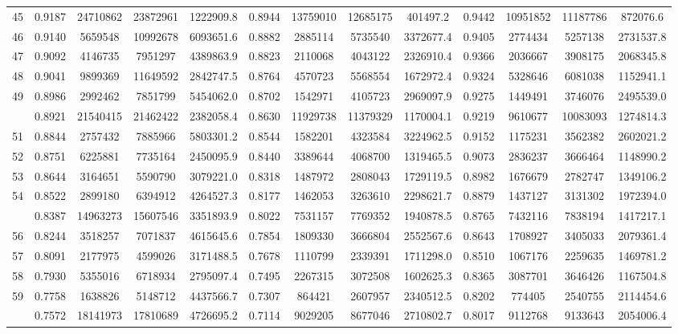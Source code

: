 \documentclass[
  12pt,
]{article}
\begin{document}
\begin{longtable}[t]{lcccccccccccc}
45 & 0.9187 & 24710862 & 23872961 & 1222909.8 & 0.8944 & 13759010 & 12685175 & 401497.2 & 0.9442 & 10951852 & 11187786 & 872076.6\\
46 & 0.9140 & 5659548 & 10992678 & 6093651.6 & 0.8882 & 2885114 & 5735540 & 3372677.4 & 0.9405 & 2774434 & 5257138 & 2731537.8\\
47 & 0.9092 & 4146735 & 7951297 & 4389863.9 & 0.8823 & 2110068 & 4043122 & 2326910.4 & 0.9366 & 2036667 & 3908175 & 2068345.8\\
48 & 0.9041 & 9899369 & 11649592 & 2842747.5 & 0.8764 & 4570723 & 5568554 & 1672972.4 & 0.9324 & 5328646 & 6081038 & 1152941.1\\
49 & 0.8986 & 2992462 & 7851799 & 5454062.0 & 0.8702 & 1542971 & 4105723 & 2969097.9 & 0.9275 & 1449491 & 3746076 & 2495539.0\\
\addlinespace
50 & 0.8921 & 21540415 & 21462422 & 2382058.4 & 0.8630 & 11929738 & 11379329 & 1170004.1 & 0.9219 & 9610677 & 10083093 & 1274814.3\\
51 & 0.8844 & 2757432 & 7885966 & 5803301.2 & 0.8544 & 1582201 & 4323584 & 3224962.5 & 0.9152 & 1175231 & 3562382 & 2602021.2\\
52 & 0.8751 & 6225881 & 7735164 & 2450095.9 & 0.8440 & 3389644 & 4068700 & 1319465.5 & 0.9073 & 2836237 & 3666464 & 1148990.2\\
53 & 0.8644 & 3164651 & 5590790 & 3079221.0 & 0.8318 & 1487972 & 2808043 & 1729119.5 & 0.8982 & 1676679 & 2782747 & 1349106.2\\
54 & 0.8522 & 2899180 & 6394912 & 4264527.3 & 0.8177 & 1462053 & 3263610 & 2298621.7 & 0.8879 & 1437127 & 3131302 & 1972394.0\\
\addlinespace
55 & 0.8387 & 14963273 & 15607546 & 3351893.9 & 0.8022 & 7531157 & 7769352 & 1940878.5 & 0.8765 & 7432116 & 7838194 & 1417217.1\\
56 & 0.8244 & 3518257 & 7071837 & 4615645.6 & 0.7854 & 1809330 & 3666804 & 2552567.6 & 0.8643 & 1708927 & 3405033 & 2079361.4\\
57 & 0.8091 & 2177975 & 4599026 & 3171488.5 & 0.7678 & 1110799 & 2339391 & 1711298.0 & 0.8510 & 1067176 & 2259635 & 1469781.2\\
58 & 0.7930 & 5355016 & 6718934 & 2795097.4 & 0.7495 & 2267315 & 3072508 & 1602625.3 & 0.8365 & 3087701 & 3646426 & 1167504.8\\
59 & 0.7758 & 1638826 & 5148712 & 4437566.7 & 0.7307 & 864421 & 2607957 & 2340512.5 & 0.8202 & 774405 & 2540755 & 2114454.6\\
\addlinespace
60 & 0.7572 & 18141973 & 17810689 & 4726695.2 & 0.7114 & 9029205 & 8677046 & 2710802.7 & 0.8017 & 9112768 & 9133643 & 2054006.4\\

\end{longtable}
\end{document}
